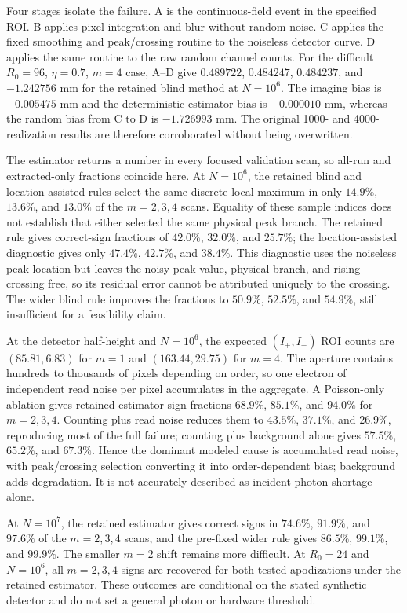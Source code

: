 Four stages isolate the failure. A is the continuous-field event in the
specified ROI. B applies pixel integration and blur without random noise.
C applies the fixed smoothing and peak/crossing routine to the noiseless
detector curve. D applies the same routine to the raw random channel counts.
For the difficult $R_0=96$, $\eta=0.7$, $m=4$ case, A--D give
$0.489722$, $0.484247$, $0.484237$, and $-1.242756$ mm for the retained
blind method at $N=10^6$. The imaging bias is $-0.005475$ mm and the
deterministic estimator bias is $-0.000010$ mm, whereas the random bias from
C to D is $-1.726993$ mm. The original 1000- and 4000-realization results
are therefore corroborated without being overwritten.

The estimator returns a number in every focused validation scan, so all-run
and extracted-only fractions coincide here. At $N=10^6$, the retained blind
and location-assisted rules select the same discrete local maximum in only
$14.9\%$, $13.6\%$, and $13.0\%$ of the $m=2,3,4$ scans. Equality of these
sample indices does not establish that either selected the same physical peak
branch. The retained rule gives correct-sign fractions of $42.0\%$, $32.0\%$,
and $25.7\%$; the location-assisted diagnostic gives only $47.4\%$, $42.7\%$,
and $38.4\%$. This diagnostic uses the noiseless peak location but leaves the
noisy peak value, physical branch, and rising crossing free, so its residual
error cannot be attributed uniquely to the crossing. The wider blind rule
improves the fractions to $50.9\%$, $52.5\%$, and $54.9\%$, still insufficient
for a feasibility claim.

At the detector half-height and $N=10^6$, the expected $(I_+,I_-)$ ROI
counts are $(85.81,6.83)$ for $m=1$ and $(163.44,29.75)$ for $m=4$.
The aperture contains hundreds to thousands of pixels depending on order,
so one electron of independent read noise per pixel accumulates in the
aggregate. A Poisson-only ablation gives retained-estimator sign fractions
$68.9\%$, $85.1\%$, and $94.0\%$ for $m=2,3,4$. Counting plus read noise
reduces them to $43.5\%$, $37.1\%$, and $26.9\%$, reproducing most of the
full failure; counting plus background alone gives $57.5\%$, $65.2\%$,
and $67.3\%$. Hence the dominant modeled cause is accumulated read noise,
with peak/crossing selection converting it into order-dependent bias;
background adds degradation. It is not accurately described as incident
photon shortage alone.

At $N=10^7$, the retained estimator gives correct signs in $74.6\%$,
$91.9\%$, and $97.6\%$ of the $m=2,3,4$ scans, and the pre-fixed wider
rule gives $86.5\%$, $99.1\%$, and $99.9\%$. The smaller $m=2$ shift
remains more difficult. At $R_0=24$ and $N=10^6$, all $m=2,3,4$ signs
are recovered for both tested apodizations under the retained estimator.
These outcomes are conditional on the stated synthetic detector and do not
set a general photon or hardware threshold.

